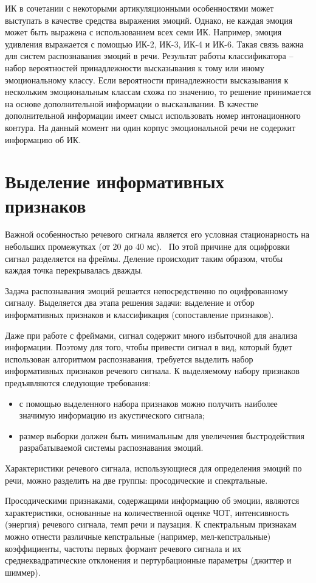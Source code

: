 ИК в сочетании с некоторыми артикуляционными особенностями может выступать в качестве средства выражения эмоций. Однако, не каждая эмоция может быть выражена с использованием всех семи ИК. Например, эмоция удивления выражается с помощью ИК-2, ИК-3, ИК-4 и ИК-6. \cite{conn} Такая связь важна для систем распознавания эмоций в речи. Результат работы классификатора -- набор вероятностей принадлежности высказывания к тому или иному эмоциональному классу. Если вероятности принадлежности высказывания к нескольким эмоциональным классам схожа по значению, то решение принимается на основе дополнительной информации о высказывании. В качестве дополнительной информации имеет смысл использовать номер интонационного контура. На данный момент ни один корпус эмоциональной речи не содержит информацию об ИК.

\section{Выделение информативных признаков}
Важной особенностью речевого сигнала является его условная стационарность на небольших промежутках (от 20 до 40 мс).~\cite{frames} По этой причине для оцифровки сигнал разделяется на фреймы. Деление происходит таким образом, чтобы каждая точка перекрывалась дважды.~\cite{mfcc-steps}

Задача распознавания эмоций решается непосредственно по оцифрованному сигналу. Выделяется два этапа решения задачи: выделение и отбор информативных признаков и классификация (сопоставление признаков).


Даже при работе с фреймами, сигнал содержит много избыточной для анализа информации. Поэтому для того, чтобы привести сигнал в вид, который будет использован алгоритмом распознавания, требуется выделить набор информативных признаков речевого сигнала. К выделяемому набору признаков предъявляются следующие требования: \cite{features-must}
\begin{itemize}
	\item с помощью выделенного набора признаков можно получить наиболее значимую информацию из акустического сигнала;
	\item размер выборки должен быть минимальным для увеличения быстродействия разрабатываемой системы распознавания эмоций.
\end{itemize}
Характеристики речевого сигнала, использующиеся для определения эмоций по речи, можно разделить на две группы: просодические и спекртальные. 

Просодическими признаками, содержащими информацию об эмоции, являются характеристики, основанные на количественной оценке ЧОТ, интенсивность (энергия) речевого сигнала, темп речи и паузация. К спектральным признакам можно отнести различные кепстральные (например, мел-кепстральные) коэффициенты, частоты первых формант речевого сигнала и их среднеквадратические отклонения и пертурбационные параметры (джиттер и шиммер).

